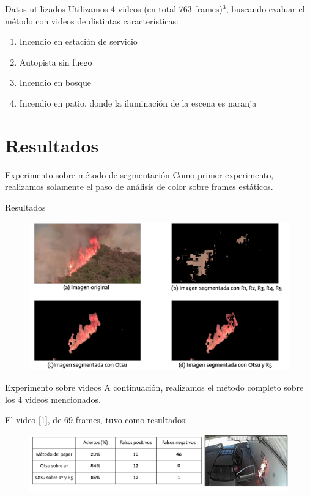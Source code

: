 \documentclass{beamer}
\begin{document}
\begin{frame}{Datos utilizados}
Utilizamos 4 videos (en total 763 frames)$^3$, buscando evaluar el método con videos de distintas características:
\begin{enumerate}
    \item Incendio en estación de servicio 
    \item Autopista sin fuego
    \item Incendio en bosque
    \item Incendio en patio, donde la iluminación de la escena es naranja
\end{enumerate}
 \end{frame}


\section{Resultados}
\begin{frame}{Experimento sobre método de segmentación}
Como primer experimento, realizamos solamente el paso de análisis de color sobre frames estáticos.
\end{frame}
\begin{frame}{Resultados}
    \begin{figure}
        \centering
        \includegraphics[width=1\linewidth]{figures/exp_img.png}
    \end{figure}
\end{frame}

\begin{frame}{Experimento sobre videos}
    A continuación, realizamos el método completo sobre los 4 videos mencionados.
    
    El video [1], de 69 frames, tuvo como resultados:
    \begin{figure}
        \centering
        \includegraphics[width=1\linewidth]{figures/exp_video_1.png}
        \label{fig:exp_video_1}
    \end{figure}
\end{frame}
\end{document}
